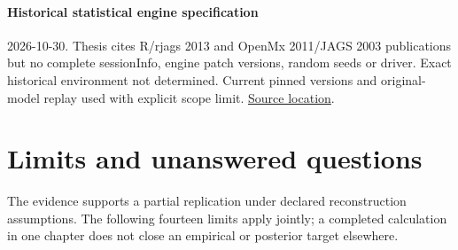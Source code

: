 \documentclass[11pt]{article}
\begin{document}
\paragraph{Historical statistical engine specification} 2026-10-30. Thesis cites R/rjags 2013 and OpenMx 2011/JAGS 2003 publications but no complete sessionInfo, engine patch versions, random seeds or driver. Exact historical environment not determined. Current pinned versions and original-model replay used with explicit scope limit. \href{https://github.com/ingaschwabe/Nature-Nurture-and-Item-Response-Theory}{Source location}.
\section{Limits and unanswered questions}\label{sec:limits}
The evidence supports a partial replication under declared reconstruction assumptions. The following fourteen limits apply jointly; a completed calculation in one chapter does not close an empirical or posterior target elsewhere.
\end{document}

